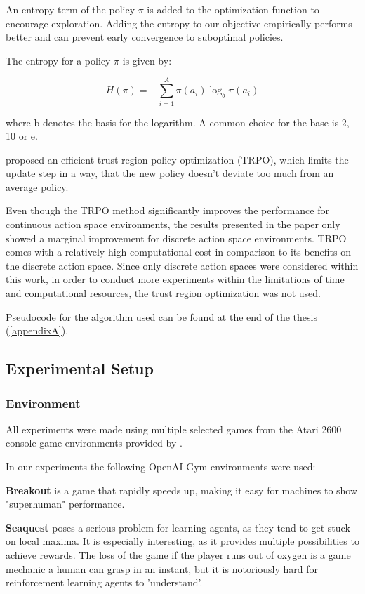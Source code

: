 An entropy term of the policy $\pi$ is added to the optimization function to encourage exploration. 
Adding the entropy to our objective empirically performs better and can prevent early convergence to suboptimal policies.

The entropy for a policy $\pi$ is given by:

\begin{equation}
H(\pi) = -\sum^A_{i=1} \pi(a_i)\log_b \pi(a_i)
\end{equation}

where b denotes the basis for the logarithm. A common choice for the base is 2, 10 or e. \citep{entropy}

\citet{ACER} proposed an efficient trust region policy optimization (TRPO), which limits the update step in a way, that the new policy doesn't deviate too much from an average policy. 

Even though the TRPO method significantly improves the performance for continuous action space environments, the results presented in the paper only showed a marginal improvement for discrete action space environments.
TRPO comes with a relatively high computational cost in comparison to its benefits on the discrete action space.
Since only discrete action spaces were considered within this work, in order to conduct more experiments within the limitations of time and computational resources, the trust region optimization was not used.

Pseudocode for the algorithm used can be found at the end of the thesis (\ref{appendixA}).

\subsection{Experimental Setup}

\subsubsection{Environment}
All experiments were made using multiple selected games from the Atari 2600 console game environments provided by \citet{openaigym}.

In our experiments the following OpenAI-Gym environments were used:

\textbf{Breakout} is a game that rapidly speeds up, making it easy for machines to show "superhuman" performance.

\textbf{Seaquest} poses a serious problem for learning agents, as they tend to get stuck on local maxima. It is especially interesting, as it provides multiple possibilities to achieve rewards.
The loss of the game if the player runs out of oxygen is a game mechanic a human can grasp in an instant, but it is notoriously hard for reinforcement learning agents to 'understand'.


